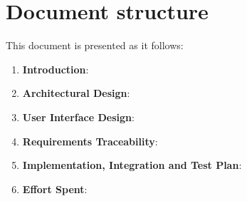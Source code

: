 \section{Document structure}
This document is presented as it follows:
\begin{enumerate}
	\item \textbf{Introduction}:

	\item \textbf{Architectural Design}:

	\item \textbf{User Interface Design}:

	\item \textbf{Requirements Traceability}:

    \item \textbf{Implementation, Integration and Test Plan}:

	\item \textbf{Effort Spent}:
\end{enumerate}
